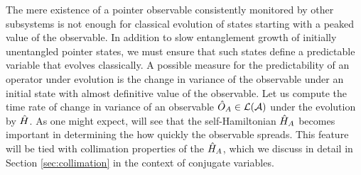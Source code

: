 \documentclass[aps,pra,onecolumn,nofootinbib,12pt,tightenlines]{revtex4-1}
\begin{document}
The mere existence of a pointer observable consistently monitored by other subsystems is not enough for classical evolution of states starting with a peaked value of the observable. In addition to slow entanglement growth of initially unentangled pointer states, we must ensure that such states define a predictable variable that evolves classically. A possible measure for the predictability of an operator under evolution is the change in variance of the observable under an initial state with almost definitive value of the observable. Let us compute the time rate of change in variance of an observable $\hat{O}_{A} \in \mathcal{L}(\mathcal{A})$ under the evolution by $\hat{H}$. {As one might expect, will see that the self-Hamiltonian $\hat{H}_{A}$ becomes important in determining the how quickly the observable spreads. This feature will be tied with collimation properties of the $\hat{H}_{A}$, which we discuss in detail in Section \ref{sec:collimation} in the context of conjugate variables.}
\end{document}
